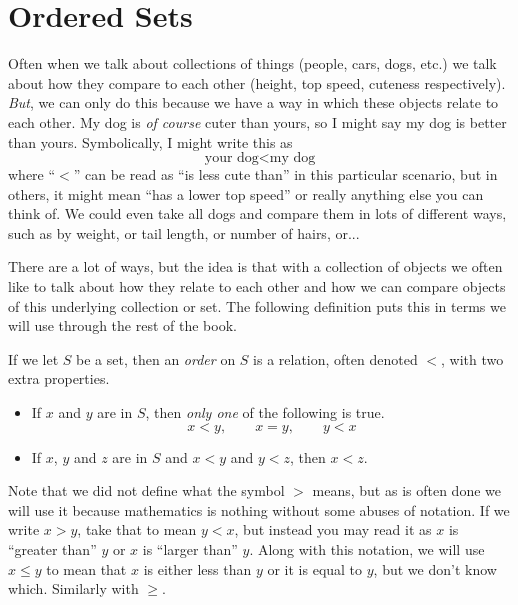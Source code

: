\documentclass[../../templates/section]{subfiles}
\begin{document}
\section{Ordered Sets}\label{sec:ordered-sets}

Often when we talk about collections of things (people, cars, dogs, etc.) we
talk about how they compare to each other (height, top speed, cuteness
respectively). \emph{But}, we can only do this because we have a way in which
these objects relate to each other. My dog is \emph{of course} cuter than
yours, so I might say my dog is better than yours. Symbolically, I might write
this as
\begin{equation*}\label{eq:doges}
    \text{your dog} < \text{my dog}
\end{equation*}
where ``$<$'' can be read as ``is less cute than'' in this particular scenario,
but in others, it might mean ``has a lower top speed'' or really anything else
you can think of. We could even take all dogs and compare them in lots of
different ways, such as by weight, or tail length, or number of hairs, or...

There are a lot of ways, but the idea is that with a collection of objects we
often like to talk about how they relate to each other and how we can compare
objects of this underlying collection or set. The following definition puts
this in terms we will use through the rest of the book.

\begin{definition}\label{def:order}
    If we let $S$ be a set, then an \emph{order} on $S$ is a relation, often
    denoted $<$, with two extra properties.
    \begin{itemize}
        \item If $x$ and $y$ are in $S$, then \emph{only one} of the following
        is true.
        \[ x < y, \qquad x = y, \qquad y < x\]
        \item If $x$, $y$ and $z$ are in $S$ and $x < y$ and $y < z$, then $x <
        z$.
    \end{itemize}
\end{definition}

Note that we did not define what the symbol $>$ means, but as is often done we
will use it because mathematics is nothing without some abuses of notation. If
we write $x > y$, take that to mean $y < x$, but instead you may read it as $x$
is ``greater than'' $y$ or $x$ is ``larger than'' $y$. Along with this
notation, we will use $x \le y$ to mean that $x$ is either less than $y$ or it
is equal to $y$, but we don't know which. Similarly with $\ge$.
\end{document}
